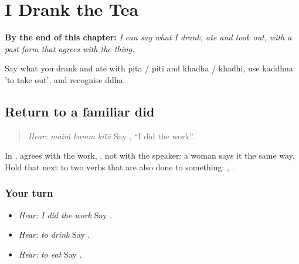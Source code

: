 
\chapter{I Drank the Tea}
\label{ch:pa-a2-pita}

\begin{chapteropening}
\textbf{By the end of this chapter:} \emph{I can say what I drank, ate and took out, with a past form that agrees with the thing.}

Say what you drank and ate with pita / piti and khadha / khadhi, use kaddhna 'to take out', and recognise ddha.
\end{chapteropening}

\section[\texorpdfstring{\pa{ਮੈਂ} \pa{ਕੰਮ} \pa{ਕੀਤਾ} · \pa{ਪੀਣਾ} … (maiṁ kamm kītā …)}{ਮੈਂ ਕੰਮ ਕੀਤਾ · ਪੀਣਾ … (maiṁ kamm kītā …)}]{Return to a familiar did}

\label{lesson:PA-C219-did-return}



\begin{quote}
\emph{Hear:} \emph{maiṁ kamm kītā} Say \textbf{  }, \textquotedblleft{}I did the work\textquotedblright{}.
\end{quote}

\begin{grammarlens}[title={Grammar Lens}]
In \textbf{  }, \textbf{} agrees with the work, \textbf{}, not with the speaker: a woman says it the same way. Hold that next to two verbs that are also done to something: \textbf{}, \textbf{}.
\end{grammarlens}

\subsection*{Your turn}
\begin{itemize}
\raggedright
  \item \emph{Hear:} \emph{I did the work} Say \textbf{  }.
  \item \emph{Hear:} \emph{to drink} Say \textbf{}.
  \item \emph{Hear:} \emph{to eat} Say \textbf{}.
\end{itemize}

